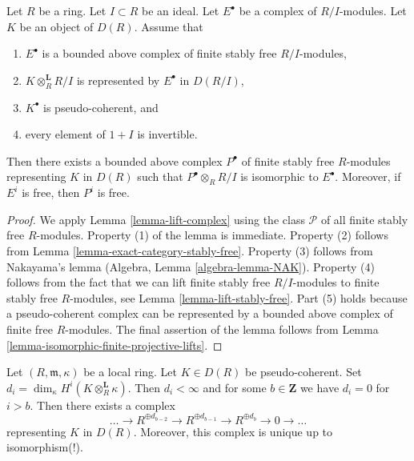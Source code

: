 \begin{lemma}
\label{lemma-lift-complex-stably-frees}
Let $R$ be a ring. Let $I \subset R$ be an ideal. Let $E^\bullet$
be a complex of $R/I$-modules. Let $K$ be an object of $D(R)$. Assume that
\begin{enumerate}
\item $E^\bullet$ is a bounded above complex of
finite stably free $R/I$-modules,
\item $K \otimes_R^\mathbf{L} R/I$ is represented by $E^\bullet$ in $D(R/I)$,
\item $K^\bullet$ is pseudo-coherent, and
\item every element of $1 + I$ is invertible.
\end{enumerate}
Then there exists a bounded above complex $P^\bullet$ of finite stably free
$R$-modules representing $K$ in $D(R)$ such that $P^\bullet \otimes_R R/I$
is isomorphic to $E^\bullet$. Moreover, if $E^i$ is free, then $P^i$ is free.
\end{lemma}

\begin{proof}
We apply Lemma \ref{lemma-lift-complex} using the class $\mathcal{P}$
of all finite stably free $R$-modules. Property (1) of the lemma is immediate.
Property (2) follows from Lemma \ref{lemma-exact-category-stably-free}.
Property (3) follows from Nakayama's lemma
(Algebra, Lemma \ref{algebra-lemma-NAK}).
Property (4) follows from the fact that we can lift finite stably free
$R/I$-modules to finite stably free $R$-modules, see
Lemma \ref{lemma-lift-stably-free}.
Part (5) holds because a pseudo-coherent complex can be represented
by a bounded above complex of finite free $R$-modules.
The final assertion of the lemma follows from
Lemma \ref{lemma-isomorphic-finite-projective-lifts}.
\end{proof}

\begin{lemma}
\label{lemma-lift-pseudo-coherent-from-residue-field}
Let $(R, \mathfrak m, \kappa)$ be a local ring. Let $K \in D(R)$
be pseudo-coherent. Set
$d_i = \dim_\kappa H^i(K \otimes_R^\mathbf{L} \kappa)$.
Then $d_i < \infty$ and for some $b \in \mathbf{Z}$ we have
$d_i = 0$ for $i > b$.
Then there exists a complex
$$
\ldots \to
R^{\oplus d_{b - 2}} \to
R^{\oplus d_{b - 1}} \to
R^{\oplus d_b} \to 0 \to \ldots
$$
representing $K$ in $D(R)$. Moreover, this complex is unique up to
isomorphism(!).
\end{lemma}

